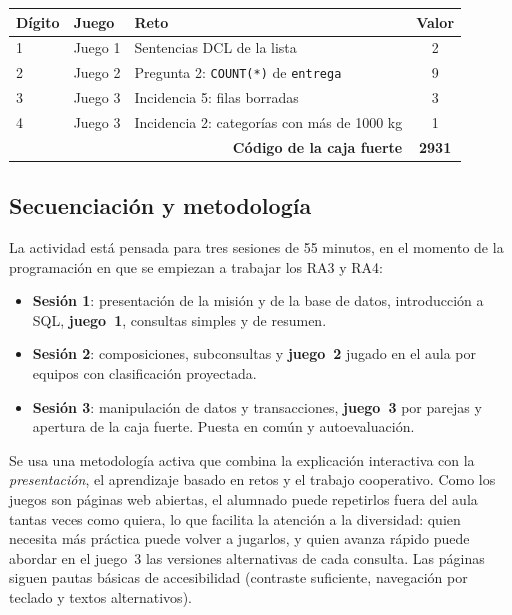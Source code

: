 \documentclass[11pt,a4paper]{article}
\begin{document}
\begin{center}
\begin{tabular}{@{}lll c@{}}
\toprule
\textbf{Dígito} & \textbf{Juego} & \textbf{Reto} & \textbf{Valor} \\
\midrule
1 & Juego 1 & Sentencias DCL de la lista & 2 \\
2 & Juego 2 & Pregunta 2: \texttt{COUNT(*)} de \texttt{entrega} & 9 \\
3 & Juego 3 & Incidencia 5: filas borradas & 3 \\
4 & Juego 3 & Incidencia 2: categorías con más de 1000 kg & 1 \\
\midrule
\multicolumn{3}{r}{\textbf{Código de la caja fuerte}} & \textbf{\Large 2931} \\
\bottomrule
\end{tabular}
\end{center}

\subsection{Secuenciación y metodología}

La actividad está pensada para tres sesiones de 55 minutos, en el momento de la programación
en que se empiezan a trabajar los RA3 y RA4:

\begin{itemize}
  \item \textbf{Sesión 1}: presentación de la misión y de la base de datos, introducción a SQL,
        \textbf{juego~1}, consultas simples y de resumen.
  \item \textbf{Sesión 2}: composiciones, subconsultas y \textbf{juego~2} jugado en el aula
        por equipos con clasificación proyectada.
  \item \textbf{Sesión 3}: manipulación de datos y transacciones, \textbf{juego~3} por
        parejas y apertura de la caja fuerte. Puesta en común y autoevaluación.
\end{itemize}

Se usa una metodología activa que combina la explicación interactiva con la
\emph{presentación}, el aprendizaje basado en retos y el trabajo cooperativo. Como los
juegos son páginas web abiertas, el alumnado puede repetirlos fuera del aula tantas veces
como quiera, lo que facilita la atención a la diversidad: quien necesita más práctica puede
volver a jugarlos, y quien avanza rápido puede abordar en el juego~3 las versiones
alternativas de cada consulta. Las páginas siguen pautas básicas de accesibilidad
(contraste suficiente, navegación por teclado y textos alternativos).
\end{document}
